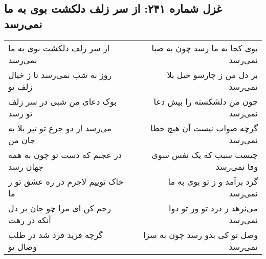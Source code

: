 \begin{center}
\section*{غزل شماره ۲۴۱: از سر زلف دلکشت بوی به ما نمی‌رسد}
\label{sec:241}
\begin{longtable}{l p{0.5cm} r}
از سر زلف دلکشت بوی به ما نمی‌رسد
&&
بوی کجا به ما رسد چون به صبا نمی‌رسد
\\
روز به شب نمی‌رسد تا ز خیال زلف تو
&&
بر دل من ز چارسو خیل بلا نمی‌رسد
\\
بوک دعای من شبی در سر زلف تو رسد
&&
چون من دلشکسته را بیش دعا نمی‌رسد
\\
می‌رسد از دو جزع تو تیر بلا به جان من
&&
گرچه صواب نیست آن هیچ خطا نمی‌رسد
\\
در عجبم که دست تو چون به همه جهان رسد
&&
چیست سبب که یک نفس سوی وفا نمی‌رسد
\\
خاک توییم لاجرم در ره عشق تو ز ما
&&
گرد برآمد و ز تو بوی به ما نمی‌رسد
\\
رحم کن ای مرا چو جان بر دل آنکه در رهت
&&
می‌نرهد ز درد تو وز تو دوا نمی‌رسد
\\
گرچه فرید فرد شد در طلب وصال تو
&&
وصل تو کی بدو رسد چون به سزا نمی‌رسد
\\
\end{longtable}
\end{center}

